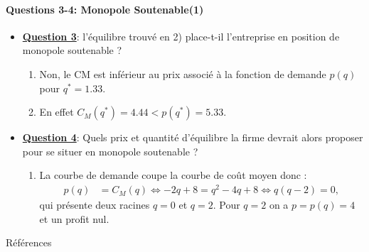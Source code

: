 \documentclass[notes, ignorenonframetext, compress, 9pt, xcolor=svgnames, aspectratio=169]{beamer}
\begin{document}
  \begin{frame}
 [allowframebreaks]{\insertsection}
 \framesubtitle{Questions 3-4: Monopole Soutenable(1)}
 \begin{itemize}
 \item \underline{\textbf{Question 3}}: l'équilibre trouvé en 2) place-t-il l’entreprise en position de monopole soutenable ? 
 \begin{enumerate}[$\cdot$]
\item Non, le CM est inférieur au prix associé à la fonction de demande $p(q)$  pour $q^*=1.33$.
\item En effet  $C_M(q^*)= 4.44 <  p(q^*) = 5.33$.
 \end{enumerate}
  \item \underline{\textbf{Question 4}}: Quels prix et quantité d'équilibre la firme devrait alors proposer pour se situer en monopole soutenable ?
 \begin{enumerate}[$\cdot$]
\item La courbe de demande coupe la courbe de coût moyen donc :
\begin{align*}
p(q) &= C_M(q) \Leftrightarrow -2q + 8 =q^2 - 4q +8  \Leftrightarrow q (q - 2) = 0,
\end{align*}
qui présente deux racines $q=0$ et $q=2$. Pour $q=2$ on a $p = p(q) = 4$ et un profit nul.
\end{enumerate}
  \end{itemize}
 \end{frame}
 
\begin{frame}[allowframebreaks]{Références}


\end{frame}
\end{document}
